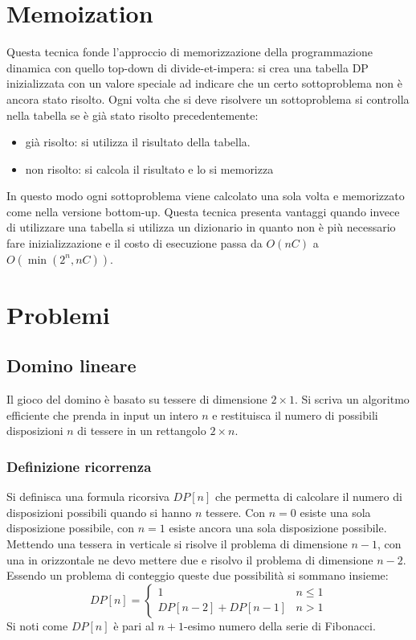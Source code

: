 \section{Memoization}
	Questa tecnica fonde l'approccio di memorizzazione della programmazione dinamica con quello top-down di divide-et-impera: si crea una tabella DP inizializzata con un valore speciale ad indicare che un certo 
	sottoproblema non \`e ancora stato risolto. Ogni volta che si deve risolvere un sottoproblema si controlla nella tabella se \`e gi\`a stato risolto precedentemente:
	\begin{itemize}
		\item gi\`a risolto: si utilizza il risultato della tabella.
		\item non risolto: si calcola il risultato e lo si memorizza
	\end{itemize}
	In questo modo ogni sottoproblema viene calcolato una sola volta e memorizzato come nella versione bottom-up. Questa tecnica presenta vantaggi quando invece di utilizzare una tabella si utilizza un dizionario 
	in quanto non \`e pi\`u necessario fare inizializzazione e il costo di esecuzione passa da $O(nC)$ a $O(\min(2^n, nC))$.
	
\section{Problemi}
	\subsection{Domino lineare}
		Il gioco del domino \`e basato su tessere di dimensione $2\times 1$. Si scriva un algoritmo efficiente che prenda in input un intero $n$ e restituisca il numero di possibili disposizioni $n$ di tessere in un 
		rettangolo $2\times n$.
		\subsubsection{Definizione ricorrenza}
			Si definisca una formula ricorsiva $DP[n]$ che permetta di calcolare il numero di disposizioni possibili quando si hanno $n$ tessere. Con $n=0$ esiste una sola disposizione possibile, con $n=1$ esiste ancora una
			sola disposizione possibile. Mettendo una tessera in verticale si risolve il problema di dimensione $n-1$, con una in orizzontale ne devo mettere due e risolvo il problema di dimensione $n-2$. Essendo un 
			problema di conteggio queste due possibilit\`a si sommano insieme:
			$$
			DP[n]=
			\begin{cases}
			1\quad & n\le 1\\
			DP[n-2] + DP[n-1]& n>1
			\end{cases}
			$$
			Si noti come $DP[n]$ \`e pari al $n+1$-esimo numero della serie di Fibonacci. 
